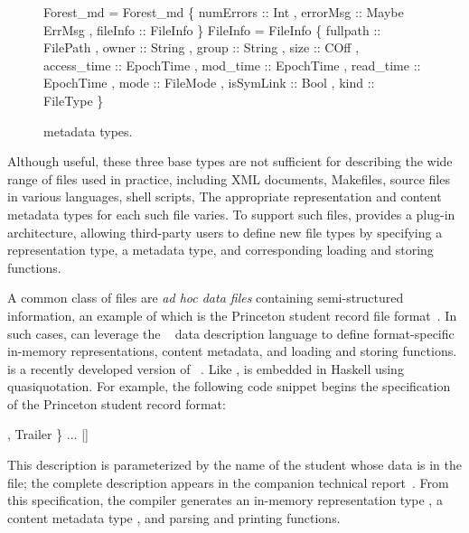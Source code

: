 \begin{figure}
\begin{centercode}
 Forest_md = Forest_md 
   \{ numErrors :: Int
   , errorMsg  :: Maybe ErrMsg
   , fileInfo  :: FileInfo \}
\mbox{}
 FileInfo = FileInfo 
   \{ fullpath    :: FilePath
   , owner       :: String
   , group       :: String
   , size        :: COff
   , access_time :: EpochTime
   , mod_time    :: EpochTime
   , read_time   :: EpochTime
   , mode        :: FileMode
   , isSymLink   :: Bool
   , kind        :: FileType \}
\end{centercode}
\caption{\forest{} metadata types.}
\label{fig:forest-md}
\end{figure}

Although useful, these three base types are not sufficient for
describing the wide range of files used in practice, including XML
documents, Makefiles, source files in various languages, shell
scripts, \etc{} The appropriate representation and content metadata
types for each such file varies. To support such files,
\forest{} provides a plug-in architecture, allowing third-party users
to define new file types by specifying a representation type, a
metadata type, and corresponding loading and storing functions.

A common class of files are \textit{ad hoc data files} containing
semi-structured information, an example of which is the Princeton
student record file format\ifanon{}~\cite{pldi-aux-materials}\fi. 
In such cases, \forest{} can leverage the \padshaskell{}~\cite{fisher-walker:icdt} data
description language to define format-specific in-memory
representations, content metadata, and loading and storing functions. 
\padshaskell{} is a recently developed version of 
\pads{}~\cite{fisher+:pads,fisher+:toplas,mandelbaum+:pads-ml}.
Like \forest{}, \padshaskell{} is embedded in Haskell using
quasiquotation.  For example, the following code snippet 
begins the \pads{} specification of the Princeton student record
format: 
\noindent
\begin{code}
[pads| \kw{data} Student(name::String) = Student
            \{ person  :: Line (Person name)
            , Header  
            , courses :: [Line Course]
            , Trailer
            \} 
       ...  |]
\end{code}
This description is parameterized by the name of the student whose
data is in the file; the complete description appears in the companion
technical report~\cite{forest-techreport}.
From this specification, the \pads{} compiler
generates an in-memory representation type , a content metadata
type , and parsing and printing functions.  

